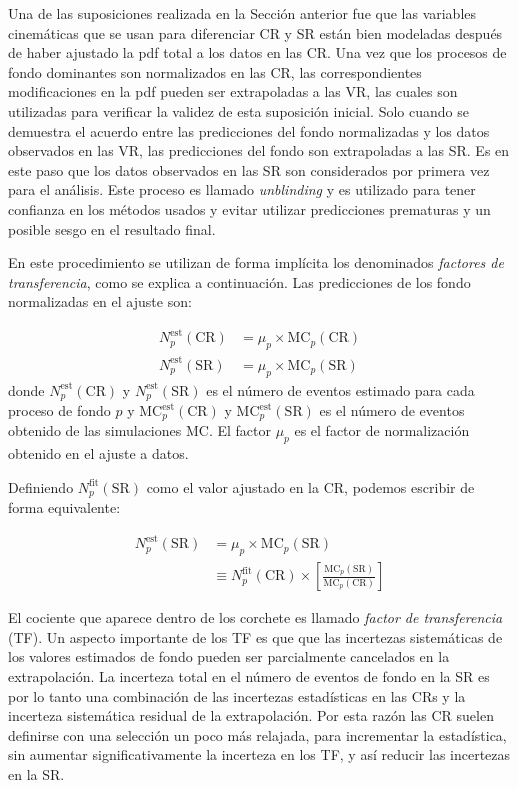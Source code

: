 Una de las suposiciones realizada en la Sección anterior fue que las variables
cinemáticas que se usan para diferenciar CR y SR están bien modeladas después de
haber ajustado la pdf total a los datos en las CR. Una vez que los procesos de
fondo dominantes son normalizados en las CR, las correspondientes modificaciones
en la pdf pueden ser extrapoladas a las VR, las cuales son utilizadas para
verificar la validez de esta suposición inicial. Solo cuando se demuestra el
acuerdo entre las predicciones del fondo normalizadas y los datos observados en
las VR, las predicciones del fondo son extrapoladas a las SR.
Es en este paso que los datos observados en las SR son considerados por primera
vez para el análisis. Este proceso es llamado \emph{unblinding} y es
utilizado para tener confianza en los métodos usados y
evitar utilizar predicciones prematuras y un posible sesgo en el
resultado final.

En este procedimiento se utilizan de forma implícita los
denominados \emph{factores de transferencia}, como se explica a continuación.
Las predicciones de los fondo normalizadas en el ajuste son:

\begin{align}
  N_p^{\text{est}}(\text{CR}) &= \mu_p \times \text{MC}_p (\text{CR})
  \\ N_p^{\text{est}}(\text{SR}) &= \mu_p \times \text{MC}_p (\text{SR})
\end{align}
%
donde $N_p^{\text{est}}(\text{CR})$ y $N_p^{\text{est}}(\text{SR})$ es el número
de eventos estimado para cada proceso de fondo $p$ y
$\text{MC}_p^{\text{est}}(\text{CR})$ y $\text{MC}_p^{\text{est}}(\text{SR})$ es
el número de eventos obtenido de las simulaciones MC. El factor $\mu_p$ es el
factor de normalización obtenido en el ajuste a datos.


Definiendo $N_p^\text{fit}(\text{SR})$ como el valor ajustado en la CR, podemos
escribir de forma equivalente:

\begin{align}
  N_p^\text{est}(\text{SR}) &= \mu_p \times \text{MC}_p (\text{SR}) \nonumber \\
  &\equiv N_p^\text{fit}(\text{CR}) \times \left[ \frac{\text{MC}_p(\text{SR})}{\text{MC}_p(\text{CR})} \right]
\end{align}

El cociente que aparece dentro de los corchete es llamado \emph{factor de
  transferencia} (TF). Un aspecto importante de los TF es que que las incertezas
sistemáticas de los valores estimados de fondo pueden ser parcialmente
cancelados en la extrapolación. La incerteza total en el número de eventos de
fondo en la SR es por lo tanto una combinación de las incertezas estadísticas en
las CRs y la incerteza sistemática residual de la extrapolación. Por esta razón
las CR suelen definirse con una selección un poco más relajada, para incrementar
la estadística, sin aumentar significativamente la incerteza en los TF, y así
reducir las incertezas en la SR.


